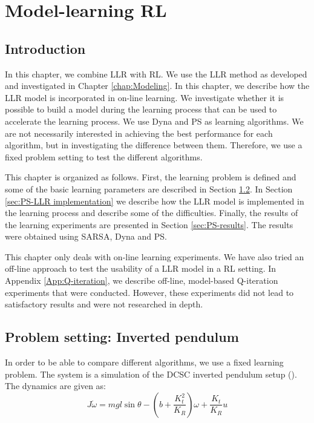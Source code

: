 \chapter{Model-learning RL}\label{chap:Prioritized Sweeping}

\section{Introduction}\label{sec:PS-introduction}
In this chapter, we combine \ac{LLR} with \ac{RL}. We use the \ac{LLR} method as developed and investigated in Chapter \ref{chap:Modeling}. In this chapter, we describe how the \ac{LLR} model is incorporated in on-line learning. We investigate whether it is possible to build a model during the learning process that can be used to accelerate the learning process. We use Dyna and \ac{PS} as learning algorithms. We are not necessarily interested in achieving the best performance for each algorithm, but in investigating the difference between them. Therefore, we use a fixed problem setting to test the different algorithms.

This chapter is organized as follows. First, the learning problem is defined and some of the basic learning parameters are described in Section \ref{sec:PS-learning problem setup}. In Section \ref{sec:PS-LLR implementation} we describe how the \ac{LLR} model is implemented in the learning process and describe some of the difficulties. Finally, the results of the learning experiments are presented in Section \ref{sec:PS-results}. The results were obtained using SARSA, Dyna and \ac{PS}.

This chapter only deals with on-line learning experiments. We have also tried an off-line approach to test the usability of a \ac{LLR} model in a \ac{RL} setting. In Appendix \ref{App:Q-iteration}, we describe off-line, model-based Q-iteration experiments that were conducted. However, these experiments did not lead to satisfactory results and were not researched in depth.



\section{Problem setting: Inverted pendulum}\label{sec:PS-learning problem setup}
In order to be able to compare different algorithms, we use a fixed learning problem. The system is a simulation of the \acs{DCSC} inverted pendulum setup (). The dynamics are given as:
\begin{equation}\label{eqn:PS-inverted pendulum}
	J\dot{\omega} = mgl\sin{\theta} - \left( b+\frac{K_t^2}{K_R}\right) \omega + \frac{K_t}{K_R}u
\end{equation}

